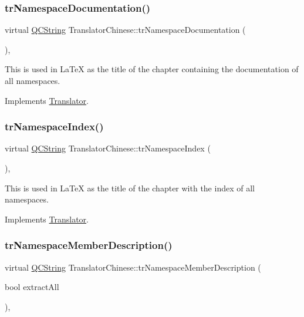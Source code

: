 \subsubsection{\texorpdfstring{trNamespaceDocumentation()}{trNamespaceDocumentation()}}
{\footnotesize\ttfamily virtual \mbox{\hyperlink{class_q_c_string}{Q\+C\+String}} Translator\+Chinese\+::tr\+Namespace\+Documentation (\begin{DoxyParamCaption}{ }\end{DoxyParamCaption})\hspace{0.3cm}{\ttfamily [inline]}, {\ttfamily [virtual]}}

This is used in La\+TeX as the title of the chapter containing the documentation of all namespaces. 

Implements \mbox{\hyperlink{class_translator}{Translator}}.

\mbox{\label{class_translator_chinese_aba5da30b8454852e2846ceb1fa0f619c}} 
\subsubsection{\texorpdfstring{trNamespaceIndex()}{trNamespaceIndex()}}
{\footnotesize\ttfamily virtual \mbox{\hyperlink{class_q_c_string}{Q\+C\+String}} Translator\+Chinese\+::tr\+Namespace\+Index (\begin{DoxyParamCaption}{ }\end{DoxyParamCaption})\hspace{0.3cm}{\ttfamily [inline]}, {\ttfamily [virtual]}}

This is used in La\+TeX as the title of the chapter with the index of all namespaces. 

Implements \mbox{\hyperlink{class_translator}{Translator}}.

\mbox{\label{class_translator_chinese_a9f06d07379aa4f92170e5cc3a1f9ca04}} 
\subsubsection{\texorpdfstring{trNamespaceMemberDescription()}{trNamespaceMemberDescription()}}
{\footnotesize\ttfamily virtual \mbox{\hyperlink{class_q_c_string}{Q\+C\+String}} Translator\+Chinese\+::tr\+Namespace\+Member\+Description (\begin{DoxyParamCaption}\item[{bool}]{extract\+All }\end{DoxyParamCaption})\hspace{0.3cm}{\ttfamily [inline]}, {\ttfamily [virtual]}}

